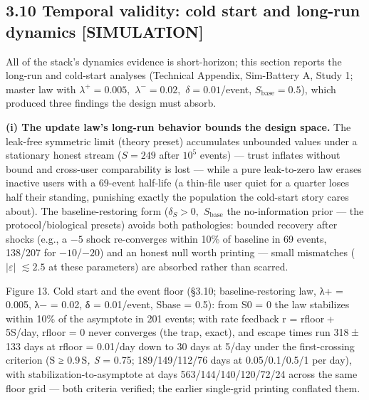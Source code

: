 \documentclass[
]{article}
\begin{document}
\subsection{3.10 Temporal validity: cold start and long-run dynamics
{[}SIMULATION{]}}\label{temporal-validity-cold-start-and-long-run-dynamics-simulation}

All of the stack's dynamics evidence is short-horizon; this section
reports the long-run and cold-start analyses (Technical Appendix,
Sim-Battery A, Study 1; master law with \(\lambda^{+} = 0.005,\)
\(\lambda^{-} = 0.02,\) \(\delta = 0.01\)/event,
\(S_{\mathrm{base}} = 0.5\)), which produced three findings the design
must absorb.

\textbf{(i) The update law's long-run behavior bounds the design space.}
The leak-free symmetric limit (theory preset) accumulates unbounded
values under a stationary honest stream (\(S = 249\) after \(10^{5}\)
events) --- trust inflates without bound and cross-user comparability is
lost --- while a pure leak-to-zero law erases inactive users with a
69-event half-life (a thin-file user quiet for a quarter loses half
their standing, punishing exactly the population the cold-start story
cares about). The baseline-restoring form (\(\delta_S > 0,\)
\(S_{\mathrm{base}}\) the no-information prior --- the
protocol/biological presets) avoids both pathologies: bounded recovery
after shocks (e.g., a \(-5\) shock re-converges within 10\% of baseline
in 69 events, 138/207 for \(-10\)/\(-20\)) and an honest null worth
printing --- small mismatches (\(|\varepsilon|\) \(\lesssim 2.5\) at
these parameters) are absorbed rather than scarred.

Figure 13. Cold start and the event floor (§3.10; baseline-restoring
law, {λ+ = 0.005}, {λ− = 0.02}, {δ = 0.01}/event, {Sbase = 0.5}): from
{S0 = 0} the law stabilizes within 10\% of the asymptote in 201 events;
with rate feedback {r = rfloor + 5S}/day, {rfloor = 0} never converges
(the trap, exact), and escape times run {318 ± 133} days at
{rfloor = 0.01}/day down to 30 days at 5/day under the first-crossing
criterion ({S ≥ 0.9 S\emph{, S} = 0.75}; 189/149/112/76 days at
0.05/0.1/0.5/1 per day), with stabilization-to-asymptote at days
563/144/140/120/72/24 across the same floor grid --- both criteria
verified; the earlier single-grid printing conflated them.
\end{document}
